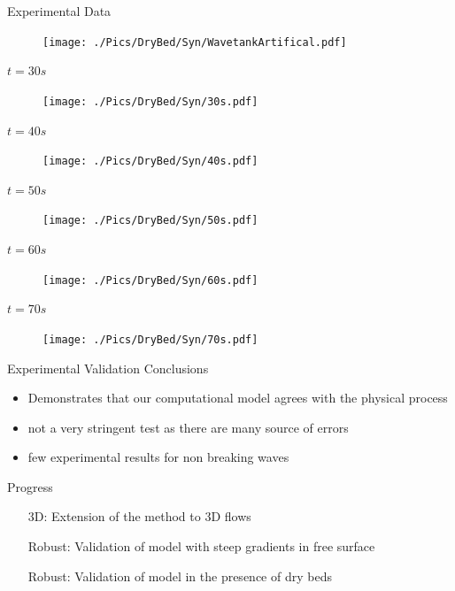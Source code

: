 \documentclass[handout]{beamer}
\begin{document}
	
\begin{frame}{Experimental Data}
	\begin{figure}
		\texttt{[image: ./Pics/DryBed/Syn/WavetankArtifical.pdf]}
	\end{figure}
\end{frame}

\begin{frame}{$t=30s$}
	\begin{figure}
		\texttt{[image: ./Pics/DryBed/Syn/30s.pdf]}
	\end{figure}
\end{frame}

\begin{frame}{$t=40s$}
	\begin{figure}
		\texttt{[image: ./Pics/DryBed/Syn/40s.pdf]}
	\end{figure}
\end{frame}

\begin{frame}{$t=50s$}
	\begin{figure}
		\texttt{[image: ./Pics/DryBed/Syn/50s.pdf]}
	\end{figure}
\end{frame}

\begin{frame}{$t=60s$}
	\begin{figure}
		\texttt{[image: ./Pics/DryBed/Syn/60s.pdf]}
	\end{figure}
\end{frame}

\begin{frame}{$t=70s$}
	\begin{figure}
		\texttt{[image: ./Pics/DryBed/Syn/70s.pdf]}
	\end{figure}
\end{frame}
\begin{frame}{Experimental Validation Conclusions}
	\begin{itemize}
		\item Demonstrates that our computational model agrees with the physical process
		\item not a very stringent test as there are many source of errors
		\item few experimental results for non breaking waves
	\end{itemize}
\end{frame}

\begin{frame}{Progress}
	\begin{itemize}
		\item[3D:] Extension of the method to 3D flows  \checkmark
		\item[Robust:] Validation of model with steep gradients in free surface \checkmark 
		\item[Robust:] Validation of model in the presence of dry beds \checkmark
	\end{itemize}
\end{frame}
\end{document}
